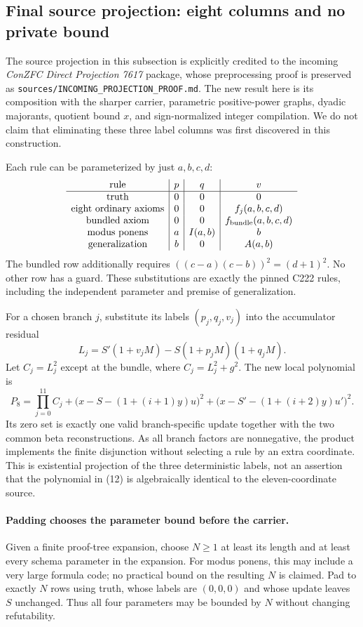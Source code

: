 \subsection{Final source projection: eight columns and no private bound}
\label{sec:projected-direct}

The source projection in this subsection is explicitly credited to the
incoming \emph{ConZFC Direct Projection 7617} package, whose preprocessing
proof is preserved as \texttt{sources/INCOMING\_PROJECTION\_PROOF.md}.
The new result here is its composition with the sharper carrier,
parametric positive-power graphs, dyadic majorants, quotient bound $x$,
and sign-normalized integer compilation.  We do not claim that eliminating
these three label columns was first discovered in this construction.

Each rule can be parameterized by just $a,b,c,d$:
\[
\begin{array}{c|c|c|c}
 \text{rule}&p&q&v\\ \hline
 \text{truth}&0&0&0\\
 \text{eight ordinary axioms}&0&0&f_j(a,b,c,d)\\
 \text{bundled axiom}&0&0&f_{\rm bundle}(a,b,c,d)\\
 \text{modus ponens}&a&I(a,b)&b\\
 \text{generalization}&b&0&A(a,b)
\end{array}
\]
The bundled row additionally requires
$((c-a)(c-b))^2=(d+1)^2$.  No other row has a guard.  These substitutions
are exactly the pinned C222 rules, including the independent
parameter and premise of generalization.

For a chosen branch $j$, substitute its labels $(p_j,q_j,v_j)$ into the
accumulator residual
\[
 L_j=S'(1+v_jM)-S(1+p_jM)(1+q_jM).
\]
Let $C_j=L_j^2$ except at the bundle, where
$C_j=L_j^2+g^2$.  The new local polynomial is
\[
 P_8=\prod_{j=0}^{11}C_j
 +\bigl(x-S-(1+(i+1)y)u\bigr)^2
 +\bigl(x-S'-(1+(i+2)y)u'\bigr)^2. \tag{12}
\]
Its zero set is exactly one valid branch-specific update together with
the two common beta reconstructions.  As all branch factors are
nonnegative, the product implements the finite disjunction without
selecting a rule by an extra coordinate.  This is existential projection
of the three deterministic labels, not an assertion that the polynomial
in (12) is algebraically identical to the eleven-coordinate source.

\paragraph{Padding chooses the parameter bound before the carrier.}
Given a finite proof-tree expansion, choose $N\ge1$ at least its length
and at least every schema parameter in the expansion.  For modus ponens,
this may include a very large formula code; no practical bound on the
resulting $N$ is claimed.  Pad to exactly $N$ rows using truth, whose
labels are $(0,0,0)$ and whose update leaves $S$ unchanged.  Thus all four
parameters may be bounded by $N$ without changing refutability.

